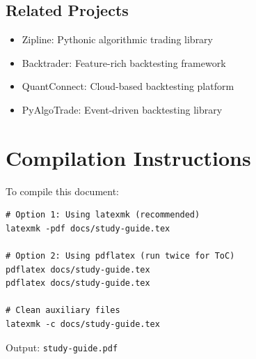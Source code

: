 \documentclass[11pt,a4paper]{article}
\begin{document}
\subsection{Related Projects}
\begin{itemize}
  \item Zipline: Pythonic algorithmic trading library
  \item Backtrader: Feature-rich backtesting framework
  \item QuantConnect: Cloud-based backtesting platform
  \item PyAlgoTrade: Event-driven backtesting library
\end{itemize}

\section*{Compilation Instructions}

To compile this document:

\begin{lstlisting}[style=shellcode]
# Option 1: Using latexmk (recommended)
latexmk -pdf docs/study-guide.tex

# Option 2: Using pdflatex (run twice for ToC)
pdflatex docs/study-guide.tex
pdflatex docs/study-guide.tex

# Clean auxiliary files
latexmk -c docs/study-guide.tex
\end{lstlisting}

Output: \texttt{study-guide.pdf}
\end{document}
